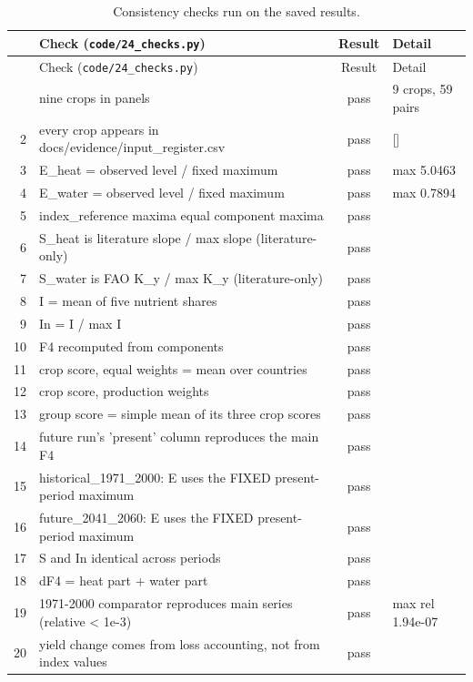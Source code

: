 {\scriptsize\begin{longtable}{rL{0.569}cL{0.261}}
\caption[Consistency checks run on the saved results]{Consistency checks run on the saved results.}\label{tab:checks}\\
\toprule
 & Check (\texttt{code/24\_checks.py}) & Result & Detail \\
\midrule\endfirsthead
\toprule
 & Check (\texttt{code/24\_checks.py}) & Result & Detail \\
\midrule\endhead
\bottomrule{} & nine crops in panels & pass & 9 crops, 59 pairs \\
2 & every crop appears in docs/evidence/input\_register.csv & pass & [] \\
3 & E\_heat = observed level / fixed maximum & pass & max 5.0463 \\
4 & E\_water = observed level / fixed maximum & pass & max 0.7894 \\
5 & index\_reference maxima equal component maxima & pass &  \\
6 & S\_heat is literature slope / max slope (literature-only) & pass &  \\
7 & S\_water is FAO K\_y / max K\_y (literature-only) & pass &  \\
8 & I = mean of five nutrient shares & pass &  \\
9 & In = I / max I & pass &  \\
10 & F4 recomputed from components & pass &  \\
11 & crop score, equal weights = mean over countries & pass &  \\
12 & crop score, production weights & pass &  \\
13 & group score = simple mean of its three crop scores & pass &  \\
14 & future run's 'present' column reproduces the main F4 & pass &  \\
15 & historical\_1971\_2000: E uses the FIXED present-period maximum & pass &  \\
16 & future\_2041\_2060: E uses the FIXED present-period maximum & pass &  \\
17 & S and In identical across periods & pass &  \\
18 & dF4 = heat part + water part & pass &  \\
19 & 1971-2000 comparator reproduces main series (relative < 1e-3) & pass & max rel 1.94e-07 \\
20 & yield change comes from loss accounting, not from index values & pass &  \\

\end{longtable}}
